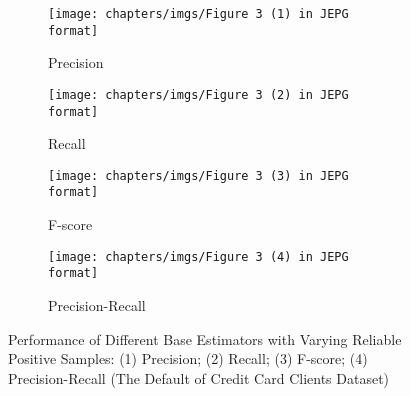 \begin{figure}[!htbp]
	\centering
	\captionsetup{size=footnotesize}
	\begin{subfigure}{0.45\textwidth}
		\centering
		\captionsetup{skip=4pt}
		\captionsetup{size=scriptsize}
		\texttt{[image: chapters/imgs/Figure 3 (1) in JEPG format]}
		\caption{Precision}
		\label{RQ2.2.sub1}
	\end{subfigure}
	\begin{subfigure}{0.45\textwidth}
		\centering
		\captionsetup{skip=4pt}
		\captionsetup{size=scriptsize}
		\texttt{[image: chapters/imgs/Figure 3 (2) in JEPG format]}
		\caption{Recall}
		\label{RQ2.2.sub2}
	\end{subfigure}
	
	
	\begin{subfigure}{0.45\textwidth}
		\centering
		\captionsetup{skip=4pt}
		\captionsetup{size=scriptsize}
		\texttt{[image: chapters/imgs/Figure 3 (3) in JEPG format]}
		\caption{F-score}
		\label{RQ2.2.sub3}
	\end{subfigure}
	\begin{subfigure}{0.45\textwidth}
		\centering
		\captionsetup{skip=4pt}
		\captionsetup{size=scriptsize}
		\texttt{[image: chapters/imgs/Figure 3 (4) in JEPG format]}
		\caption{Precision-Recall}
		\label{RQ2.2.sub4}
	\end{subfigure}
	
	\caption{Performance of Different Base Estimators with Varying Reliable Positive Samples: (1) Precision; (2) Recall; (3) F-score; (4) Precision-Recall (The Default of Credit Card Clients Dataset)}
    \label{RQ2.2}
\end{figure}

